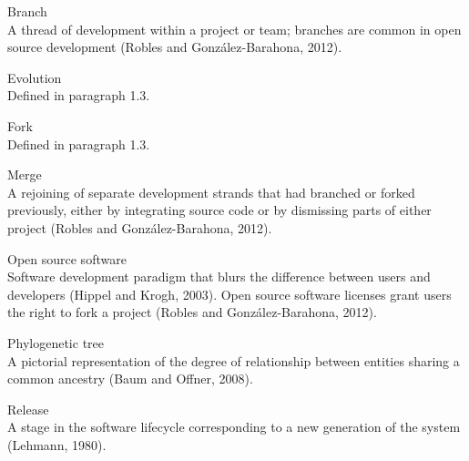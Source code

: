 \documentclass[
11pt, %
english, %
singlespacing, %
headsepline, %
oneside,
]{MastersDoctoralThesis} %
\begin{document}
\begin{description}

\item{Branch} \hfill \\ A thread of development within a project or team; branches are common in open source development (Robles and González-Barahona, 2012).

\item{Evolution} \hfill \\ Defined in paragraph 1.3.

\item{Fork} \hfill \\ Defined in paragraph 1.3.

\item{Merge} \hfill \\ A rejoining of separate development strands that had branched or forked previously, either by integrating source code or by dismissing parts of either project (Robles and González-Barahona, 2012).

\item{Open source software} \hfill \\ Software development paradigm that blurs the difference between users and developers (Hippel and Krogh, 2003). Open source software licenses grant users the right to fork a project (Robles and González-Barahona, 2012).

\item{Phylogenetic tree} \hfill \\ A pictorial representation of the degree of relationship between entities sharing a common ancestry (Baum and Offner, 2008).

\item{Release} \hfill \\ A stage in the software lifecycle corresponding to a new generation of the system (Lehmann, 1980).

\end{description}


\mainmatter %

\pagestyle{thesis} %

\end{document}
